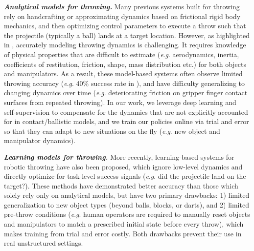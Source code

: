 \documentclass[journal]{IEEEtran}
\newcommand{\ie}{\textit{i}.\textit{e}., }
\newcommand{\eg}{\textit{e}.\textit{g}. }
\newcommand{\mypara}[1]{\par\vspace*{0.8mm}\noindent\textbf{\textit{#1}}}
\begin{document}
\mypara{Analytical models for throwing.} Many previous systems built for throwing \cite{mason1993dynamic,gai2013motion,mori20091,senoo2008high,taylor2019optimal} rely on handcrafting or approximating dynamics based on frictional rigid body mechanics, and then optimizing control parameters to execute a throw such that the projectile (typically a ball) lands at a target location. However, as highlighted in \citet{mason1993dynamic}, accurately modeling throwing dynamics is challenging. It requires knowledge of physical properties that are difficult to estimate (\eg aerodynamics, inertia, coefficients of restitution, friction, shape, mass distribution etc.) for both objects and manipulators. As a result, these model-based systems often observe limited throwing accuracy (\eg 40\% success rate in \cite{senoo2008high}), and have difficulty generalizing to changing dynamics over time (\eg deteriorating friction on gripper finger contact surfaces from repeated throwing). In our work, we leverage deep learning and self-supervision to compensate for the dynamics that are not explicitly accounted for in contact/ballistic models, and we train our policies online via trial and error so that they can adapt to new situations on the fly (\eg new object and manipulator dynamics).
\mypara{Learning models for throwing.} More recently, learning-based systems for robotic throwing \cite{aboaf1988task,hu2010ball,kober2011reinforcement,ghadirzadeh2017deep} have also been proposed, which ignore low-level dynamics and directly optimize for task-level success signals (\eg did the projectile land on the target?). These methods have demonstrated better accuracy than those which solely rely only on analytical models, but have two primary drawbacks: 1) limited generalization to new object types (beyond balls, blocks, or darts), and 2) limited pre-throw conditions (\eg human operators are required to manually reset objects and manipulators to match a prescribed initial state before every throw), which makes training from trial and error costly. Both drawbacks prevent their use in real unstructured settings. %

\end{document}
